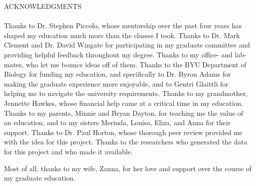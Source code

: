 \documentclass[12pt]{article}
\makeatletter
\newcommand{\pdfbookmarkraised}[3]{\Hy@raisedlink{\pdfbookmark[#1]{#2}{#3}}}
\makeatother
\begin{document}
\doublespacing

\begin{titlingpage}
	\setcounter{page}{3}
	\begin{center}
		ACKNOWLEDGMENTS
	\end{center}
	\paragraph{}
	Thanks to Dr. Stephen Piccolo, whose mentorship over the past four years has shaped my education much more than the classes I took.
	Thanks to Dr. Mark Clement and Dr. David Wingate for participating in my graduate committee and providing helpful feedback throughout my degree.
	Thanks to my office- and lab-mates, who let me bounce ideas off of them.
	Thanks to the BYU Department of Biology for funding my education, and specifically to Dr. Byron Adams for making the graduate experience more enjoyable, and to Gentri Glaittli for helping me to navigate the university requirements.
	Thanks to my grandmother, Jennette Hawkes, whose financial help came at a critical time in my education.
	Thanks to my parents, Minnie and Bryan Dayton, for teaching me the value of an education, and to my sisters Merinda, Louisa, Eliza, and Anna for their support.
	Thanks to Dr. Paul Horton, whose thorough peer review provided me with the idea for this project.
	Thanks to the researchers who generated the data for this project and who made it available.

	Most of all, thanks to my wife, Zanna, for her love and support over the course of my graduate education.
\end{titlingpage}

\setcounter{page}{4}
{}
\tableofcontents
\newpage
{}
{}
{%
\let\oldnumberline\numberline%
\renewcommand{\numberline}{\tablename~\oldnumberline}%
\listoftables%
}
\newpage
{}
{}
{%
\let\oldnumberline\numberline%
\renewcommand{\numberline}{\figurename~\oldnumberline}%
\listoffigures%
}
\newpage

\renewcommand{\figuresection}{\pdfbookmarkraised{0}{\figurename{s}}{figure}\figurename{s}}
\renewcommand{\tablesection}{\pdfbookmarkraised{0}{\tablename{s}}{table}\tablename{s}}
\end{document}
